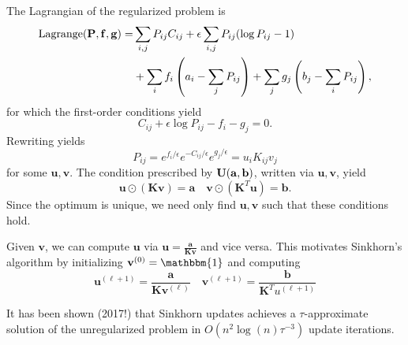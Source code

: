 \documentclass[11pt,reqno]{amsart}
\renewcommand{\b}{\mathbf}
\newcommand{\one}{\mathbbm{1}}
\newcommand{\Lag}{\operatorname{Lagrange}}
\theoremstyle{definition}
\theoremstyle{remark}
\begin{document}
The Lagrangian of the regularized problem is \begin{align*}
\Lag(\b P, \b f, \b g) = & \sum_{i,j} P_{ij}C_{ij} + \epsilon \sum_
{i,j} P_{ij}
(\log
 P_{ij} - 1) \\ 
& + \sum_i f_i\pr{a_i - \sum_{j}P_{ij}} + \sum_j g_j \pr{b_j - \sum_i P_{ij}},
\end{align*}
for which the first-order conditions yield \[
C_{ij} + \epsilon \log P_{ij} - f_i - g_j = 0.
\]
Rewriting yields \[
P_{ij} = e^{f_i/\epsilon} e^{-C_{ij} / \epsilon} e^{g_j / \epsilon} = u_i K_{ij}
 v_j
\]
for some $\b u, \b v$. The condition prescribed by $\feasible$, written via $\b
 u, \b v$, yield \[
\b u\odot (\b K \b v) = \b a \quad \b v  \odot(\b K^T \b u) = \b b.
\]
Since the optimum is unique, we need only find $\b u, \b v$ such that these
 conditions hold.

Given $\b v$, we can compute $\b u$ via $\b u = \frac{\b a}{\b K \b v}$ and
 vice versa. This motivates Sinkhorn's algorithm by initializing $\b v^{(0)} =
 \one$ and computing \[
\b u^{(\ell + 1)} = \frac{\b a}{\b K \b v^{(\ell)}} \quad \b v^{(\ell + 1)} = \frac{\b b}
{\b K^T u^{(\ell + 1)}}
\]

It has been shown (2017!) that Sinkhorn updates achieves a $\tau$-approximate
 solution of the unregularized problem in $O(n^2 \log(n)\tau^{-3})$ update
 iterations.

% 
% 
\end{document}
